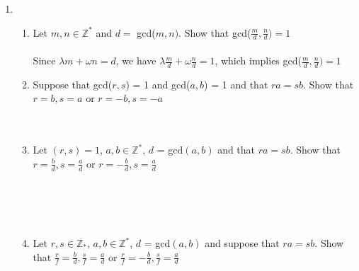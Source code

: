\documentclass[11pt]{article}
\begin{document}
\begin{enumerate}
\newpage %
\item 
\begin{enumerate}
\item Let $m,n \in \mathbb{Z}^*$ and $d = $ gcd($m,n)$.  Show that gcd($\tfrac{m}{d} , \tfrac{n}{d}) = 1$
\\\\
Since $\lambda m + \omega n = d$, we have $\lambda \tfrac{m}{d} + \omega \tfrac{n}{d} = 1$, which implies gcd($\tfrac{m}{d} , \tfrac{n}{d}) = 1$
\\
\item Suppose that gcd($r,s$) = 1 and gcd($a,b$) = 1 and that $ra = sb$.  Show that $r=b, s = a$ or $r = -b, s = -a$
\\
\\
\\
\item Let $(r,s) = 1$, $a,b \in \mathbb{Z}^*$, $d$ = gcd$(a,b)$ and that $ra = sb$.  Show that $r = \tfrac{b}{d}, s = \tfrac{a}{d}$ or $r = -\tfrac{b}{d}, s=\tfrac{a}{d}$
\\
\\
\\
\\
\\

\item Let $r,s \in \mathbb{Z}_*$, $a,b \in \mathbb{Z}^*$, $d$ = gcd$(a,b)$ and suppose that $ra = sb$.  Show that $\tfrac{r}{f} = \tfrac{b}{d}, \tfrac{s}{f} = \tfrac{a}{d}$ or $\tfrac{r}{f} = -\tfrac{b}{d}, \tfrac{s}{f}=\tfrac{a}{d}$
\end{enumerate}



\end{enumerate}
\end{document}
